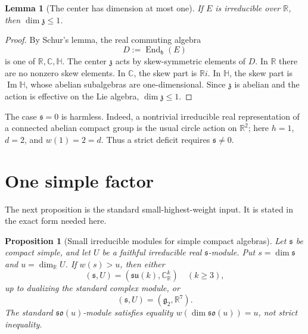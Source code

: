 \documentclass[11pt]{article}
\newtheorem{lemma}[theorem]{Lemma}
\newtheorem{proposition}[theorem]{Proposition}
\theoremstyle{remark}
\newcommand{\RR}{\mathbb{R}}
\newcommand{\CC}{\mathbb{C}}
\newcommand{\HH}{\mathbb{H}}
\newcommand{\fh}{\mathfrak{h}}
\newcommand{\fs}{\mathfrak{s}}
\newcommand{\fz}{\mathfrak{z}}
\newcommand{\so}{\mathfrak{so}}
\newcommand{\su}{\mathfrak{su}}
\newcommand{\End}{\operatorname{End}}
\begin{document}
\begin{lemma}[The center has dimension at most one]\label{lem:center-one}
If \(E\) is irreducible over \(\RR\), then \(\dim \fz\leq 1\).
\end{lemma}

\begin{proof}
By Schur's lemma, the real commuting algebra
\[
  D:=\End_{\fh}(E)
\]
is one of \(\RR,\CC,\HH\).  The center \(\fz\) acts by skew-symmetric elements of \(D\).  In \(\RR\) there are no nonzero skew elements.  In \(\CC\), the skew part is \(\RR i\).  In \(\HH\), the skew part is \(\operatorname{Im}\HH\), whose abelian subalgebras are one-dimensional.  Since \(\fz\) is abelian and the action is effective on the Lie algebra, \(\dim\fz\leq 1\).
\end{proof}

The case \(\fs=0\) is harmless.  Indeed, a nontrivial irreducible real representation of a connected abelian compact group is the usual circle action on \(\RR^2\); here \(h=1\), \(d=2\), and \(w(1)=2=d\).  Thus a strict deficit requires \(\fs\neq 0\).

\section{One simple factor}

The next proposition is the standard small-highest-weight input.  It is stated in the exact form needed here.

\begin{proposition}[Small irreducible modules for simple compact algebras]\label{prop:simple-table}
Let \(\fs\) be compact simple, and let \(U\) be a faithful irreducible real \(\fs\)-module.  Put \(s=\dim\fs\) and \(u=\dim_{\RR}U\).  If \(w(s)>u\), then either
\[
  (\fs,U)=(\su(k),\CC^k_{\RR})\quad (k\geq 3),
\]
up to dualizing the standard complex module, or
\[
  (\fs,U)=(\mathfrak g_2,\RR^7).
\]
The standard \(\so(u)\)-module satisfies equality \(w(\dim\so(u))=u\), not strict inequality.
\end{proposition}
\end{document}

